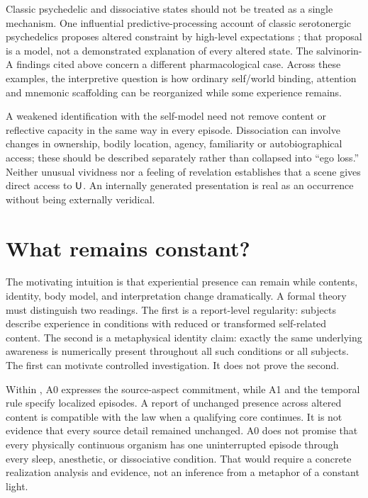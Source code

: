 Classic psychedelic and dissociative states should not be treated as a single mechanism. One influential predictive-processing account of classic serotonergic psychedelics proposes altered constraint by high-level expectations \cite{CarhartHarrisFriston2019}; that proposal is a model, not a demonstrated explanation of every altered state. The salvinorin-A findings cited above concern a different pharmacological case. Across these examples, the interpretive question is how ordinary self/world binding, attention and mnemonic scaffolding can be reorganized while some experience remains.

A weakened identification with the self-model need not remove content or reflective capacity in the same way in every episode. Dissociation can involve changes in ownership, bodily location, agency, familiarity or autobiographical access; these should be described separately rather than collapsed into ``ego loss.'' Neither unusual vividness nor a feeling of revelation establishes that a scene gives direct access to $\mathsf{U}$. An internally generated presentation is real as an occurrence without being externally veridical.

\section{What remains constant?}\label{section:altered:what-remains-constant}
The motivating intuition is that experiential presence can remain while contents, identity, body model, and interpretation change dramatically. A formal theory must distinguish two readings. The first is a report-level regularity: subjects describe experience in conditions with reduced or transformed self-related content. The second is a metaphysical identity claim: exactly the same underlying awareness is numerically present throughout all such conditions or all subjects. The first can motivate controlled investigation. It does not prove the second.

Within \spctwo, A0 expresses the source-aspect commitment, while A1 and the temporal rule specify localized episodes. A report of unchanged presence across altered content is compatible with the law when a qualifying core continues. It is not evidence that every source detail remained unchanged. A0 does not promise that every physically continuous organism has one uninterrupted episode through every sleep, anesthetic, or dissociative condition. That would require a concrete realization analysis and evidence, not an inference from a metaphor of a constant light.

